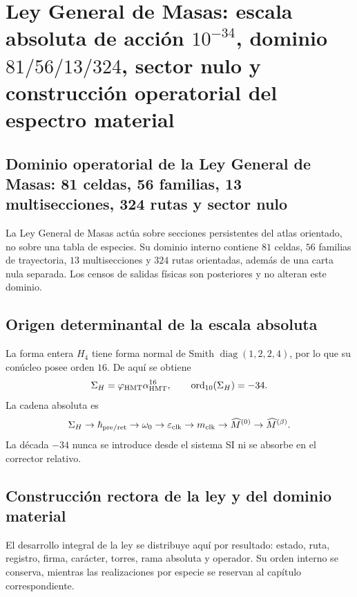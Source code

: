 \chapter{Ley General de Masas: escala absoluta de acción \texorpdfstring{\(10^{-34}\)}{10⁻³⁴}, dominio \texorpdfstring{\(81/56/13/324\)}{81/56/13/324}, sector nulo y construcción operatorial del espectro material}
\label{chap:ley-general-masas-dominio-completo}

\section{Dominio operatorial de la Ley General de Masas: 81 celdas, 56 familias, 13 multisecciones, 324 rutas y sector nulo}
La Ley General de Masas actúa sobre secciones persistentes del atlas
orientado, no sobre una tabla de especies. Su dominio interno contiene
\(81\) celdas, \(56\) familias de trayectoria, \(13\)
multisecciones y \(324\) rutas orientadas, además de una
carta nula separada. Los censos de salidas físicas son posteriores y no
alteran este dominio.

\section{Origen determinantal de la escala absoluta}
La forma entera \(H_4\) tiene forma normal de Smith
\(\operatorname{diag}(1,2,2,4)\), por lo que su conúcleo posee orden \(16\).
De aquí se obtiene
\[
 \Sigma_H=\varphi_{\rm HMT}\alpha_{\rm HMT}^{16},
 \qquad \operatorname{ord}_{10}(\Sigma_H)=-34.
\]
La cadena absoluta es
\[
 \Sigma_H\to\hbar_{\rm pre/ret}\to\omega_0
 \to\varepsilon_{\rm clk}\to m_{\rm clk}
 \to\widehat M^{(0)}\to\widehat M^{(\beta)}.
\]
La década \(-34\) nunca se introduce desde el sistema SI ni se absorbe en el
corrector relativo.

\section{Construcción rectora de la ley y del dominio material}
El desarrollo integral de la ley se distribuye aquí por resultado: estado, ruta,
registro, firma, carácter, torres, rama absoluta y operador. Su orden interno
se conserva, mientras las realizaciones por especie se reservan al capítulo
correspondiente.

